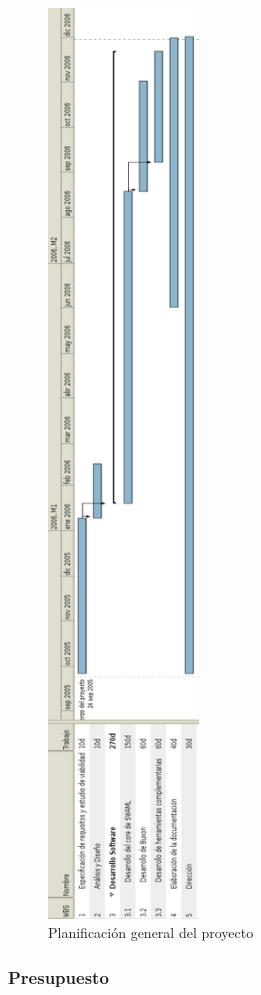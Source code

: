 \begin{figure}[p]
 	\centering
	\includegraphics[width=4cm]{images/gantt.png}
	\caption{Planificación general del proyecto}
	\label{fig:gantt}
\end{figure}

\newpage

\subsubsection{Presupuesto}

